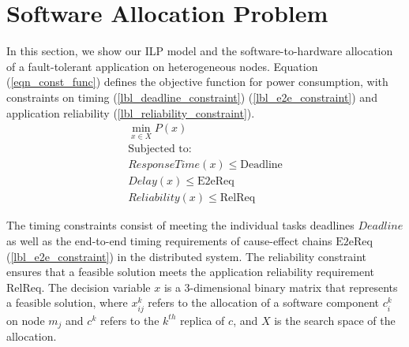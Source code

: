 \section{Software Allocation Problem}\label{sec_allocation}
In this section, we show our ILP model and the software-to-hardware allocation of a fault-tolerant application on heterogeneous nodes. Equation (\ref{eqn_const_func}) defines the objective function for power consumption, with constraints on timing (\ref{lbl_deadline_constraint}) (\ref{lbl_e2e_constraint}) and application reliability (\ref{lbl_reliability_constraint}). 
\begin{align}
\label{eqn_const_func}
\min_{x\in X} P(x) \\
\text{Subjected to:}\nonumber\\
\label{lbl_deadline_constraint} 
ResponseTime(x) \leq \mathrm{Deadline}\\ 
\label{lbl_e2e_constraint}
Delay(x) \leq \mathrm{E2eReq} \\
\label{lbl_reliability_constraint}
Reliability(x) \leq \mathrm{RelReq}
\end{align}

The timing constraints consist of meeting the individual tasks deadlines $Deadline$  as well as the end-to-end timing requirements of cause-effect chains $\mathrm{E2eReq}$ (\ref{lbl_e2e_constraint}) in the distributed system. The reliability constraint ensures that a feasible solution meets the application reliability requirement $\mathrm{RelReq}$. The decision variable $x$ is a 3-dimensional binary matrix that represents a feasible solution, where $x^k_{ij}$ refers to the allocation of a software component $c^k_i$ on node $m_j$ and $c^k$ refers to the $k^{th}$ replica of $c$, and $X$ is the search space of the allocation. 


